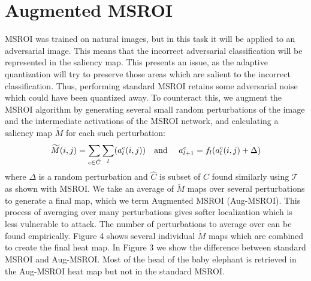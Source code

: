 \section{Augmented MSROI}
MSROI was trained on natural images, but in this task it will be applied to an adversarial image. 
This means that the incorrect adversarial classification will be represented in the saliency map.
This presents an issue, as the adaptive quantization will try to preserve those areas which are salient to the incorrect classification. 
Thus, performing standard MSROI retains some adversarial noise which could have been quantized away.
To counteract this, we augment the MSROI algorithm by generating several small random perturbations of the image and the intermediate activations of the MSROI network, and calculating a saliency map $\widetilde{M}$ for each such perturbation:
\[
\widetilde{M}(i,j) = \sum_{c \in \hat{C}}  \sum_l (a_l^c(i ,j))  \text{\quad and \quad} a_{l+1}^c = f_l(a_l^c(i,j) +\Delta)
\]
where $\Delta$ is a random perturbation and $\hat{C}$ is subset of $C$ found similarly using $\mathcal{T}$ as shown with MSROI.
We take an average of $\widetilde{M}$ maps over several perturbations to generate a final map, which we term Augmented MSROI (Aug-MSROI).
This process of averaging over many perturbations gives softer localization which is less vulnerable to attack.
The number of perturbations to average over can be found empirically.  %
Figure 4 shows several individual $\widetilde{M}$ maps which are combined to create the final heat map. 
In Figure 3 we show the difference between standard MSROI and Aug-MSROI. 
Most of the head of the baby elephant is retrieved in the Aug-MSROI heat map but not in the standard MSROI. 

